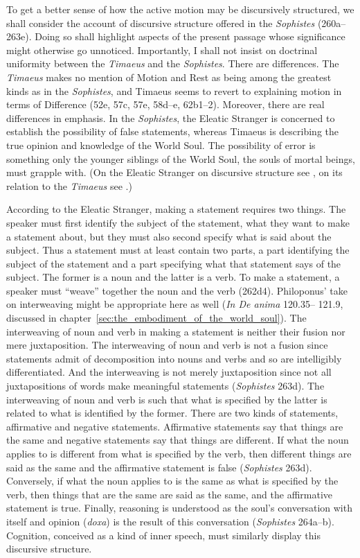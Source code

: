 To get a better sense of how the active motion may be discursively structured, we shall consider the account of discursive structure offered in the \emph{Sophistes} (260a--263e). Doing so shall highlight aspects of the present passage whose significance might otherwise go unnoticed. Importantly, I shall not insist on doctrinal uniformity between the \emph{Timaeus} and the \emph{Sophistes}. There are differences. The \emph{Timaeus} makes no mention of Motion and Rest as being among the greatest kinds as in the \emph{Sophistes}, and Timaeus seems to revert to explaining motion in terms of Difference (52e, 57c, 57e, 58d--e, 62b1--2). Moreover, there are real differences in emphasis. In the \emph{Sophistes}, the Eleatic Stranger is concerned to establish the possibility of false statements, whereas Timaeus is describing the true opinion and knowledge of the World Soul. The possibility of error is something only the younger siblings of the World Soul, the souls of mortal beings, must grapple with. (On the Eleatic Stranger on discursive structure see \citealt[]{Frede:1992ec}, on its relation to the \emph{Timaeus} see \citealt[]{Betegh:2019fq}.)

According to the Eleatic Stranger, making a statement requires two things. The speaker must first identify the subject of the statement, what they want to make a statement about, but they must also second specify what is said about the subject. Thus a statement must at least contain two parts, a part identifying the subject of the statement and a part specifying what that statement says of the subject. The former is a noun and the latter is a verb. To make a statement, a speaker must ``weave'' together the noun and the verb (262d4). Philoponus' take on interweaving might be appropriate here as well (\emph{In De anima} 120.35– 121.9, discussed in chapter~\ref{sec:the_embodiment_of_the_world_soul}). The interweaving of noun and verb in making a statement is neither their fusion nor mere juxtaposition. The interweaving of noun and verb is not a fusion since statements admit of decomposition into nouns and verbs and so are intelligibly differentiated. And the interweaving is not merely juxtaposition since not all juxtapositions of words make meaningful statements (\emph{Sophistes} 263d). The interweaving of noun and verb is such that what is specified by the latter is related to what is identified by the former. There are two kinds of statements, affirmative and negative statements. Affirmative statements say that things are the same and negative statements say that things are different. If what the noun applies to is different from what is specified by the verb, then different things are said as the same and the affirmative statement is false (\emph{Sophistes} 263d). Conversely, if what the noun applies to is the same as what is specified by the verb, then things that are the same are said as the same, and the affirmative statement is true. Finally, reasoning is understood as the soul's conversation with itself and opinion (\emph{doxa}) is the result of this conversation (\emph{Sophistes} 264a--b). Cognition, conceived as a kind of inner speech, must similarly display this discursive structure.

